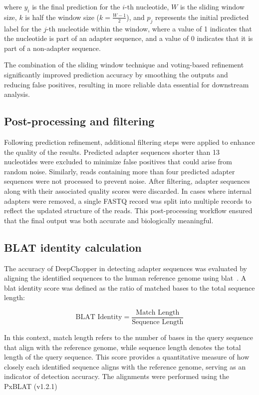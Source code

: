 \documentclass[pdflatex,sn-nature, lineno]{sn-jnl}%
\begin{document}
where \(y_i\) is the final prediction for the $i$-th nucleotide, \( W \) is the sliding window size, \( k \) is half the window size (\( k = \frac{W-1}{2}\)), and  \(p_j\) represents the initial predicted label for the \(j\)-th nucleotide within the window, where a value of 1 indicates that the nucleotide is part of an adapter sequence, and a value of 0 indicates that it is part of a non-adapter sequence.

The combination of the sliding window technique and voting-based refinement significantly improved prediction accuracy by smoothing the outputs and reducing false positives, resulting in more reliable data essential for downstream analysis.

\subsection{Post-processing and filtering}

Following prediction refinement, additional filtering steps were applied to enhance the quality of the results.
Predicted adapter sequences shorter than 13 nucleotides were excluded to minimize false positives that could arise from random noise. Similarly, reads containing more than four predicted adapter sequences were not processed to prevent noise.
After filtering, adapter sequences along with their associated quality scores were discarded.
In cases where internal adapters were removed, a single FASTQ record was split into multiple records to reflect the updated structure of the reads.
This post-processing workflow ensured that the final output was both accurate and biologically meaningful.

\subsection{BLAT identity calculation}

The accuracy of DeepChopper in detecting adapter sequences was evaluated by aligning the identified sequences to the human reference genome using \gls{blat}~\cite{kent2002blat}.
A \gls{blat} identity score was defined as the ratio of matched bases to the total sequence length:

\[
	\textrm{BLAT Identity} = \frac{\textrm{Match Length}}{\textrm{Sequence Length}}
\]

In this context, match length refers to the number of bases in the query sequence that align with the reference genome, while sequence length denotes the total length of the query sequence.
This score provides a quantitative measure of how closely each identified sequence aligns with the reference genome, serving as an indicator of detection accuracy.
The alignments were performed using the PxBLAT (v1.2.1)~\cite{li2024pxblat}
\end{document}
